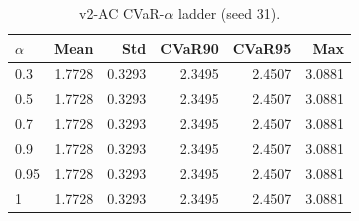 \begin{table}[H]
    \centering
    \caption{v2-AC CVaR-$\alpha$ ladder (seed 31).}
    \label{tab:v2_ac_alpha}
    \begin{tabular}{@{}lrrrrr@{}}
        \toprule
        $\alpha$ & Mean & Std & CVaR90 & CVaR95 & Max \\
        \midrule
        0.3 & 1.7728 & 0.3293 & 2.3495 & 2.4507 & 3.0881 \\
        0.5 & 1.7728 & 0.3293 & 2.3495 & 2.4507 & 3.0881 \\
        0.7 & 1.7728 & 0.3293 & 2.3495 & 2.4507 & 3.0881 \\
        0.9 & 1.7728 & 0.3293 & 2.3495 & 2.4507 & 3.0881 \\
        0.95 & 1.7728 & 0.3293 & 2.3495 & 2.4507 & 3.0881 \\
        1 & 1.7728 & 0.3293 & 2.3495 & 2.4507 & 3.0881 \\
        \bottomrule
    \end{tabular}
\end{table}
